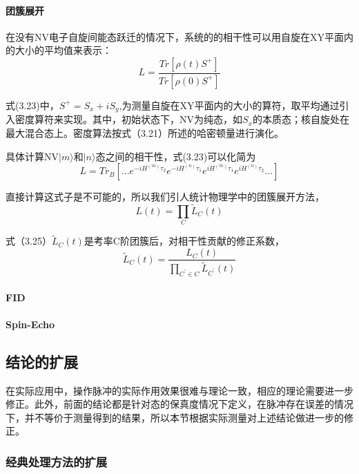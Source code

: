 \paragraph{团簇展开}
在没有NV电子自旋间能态跃迁的情况下，系统的的相干性可以用自旋在XY平面内的大小的平均值来表示：
\begin{equation}
    L=\frac{Tr[\rho(t) S^{+}]}{Tr[\rho(0) S^{+}]}
\end{equation}

式(3.23)中，$S^{+}=S_x+\num{i} S_y$,为测量自旋在XY平面内的大小的算符，取平均通过引入密度算符来实现。其中，初始状态下，NV为纯态，如$S_x$的本质态；核自旋处在最大混合态上。密度算法按式（3.21）所述的哈密顿量进行演化。

具体计算NV$|m\rangle$和$|n\rangle$态之间的相干性，式(3.23)可以化简为
\begin{equation}
    L=Tr_B[... e^{-\num{i} H^{(m)}\tau_2} e^{-\num{i} H^{(n)}\tau_1} e^{\num{i} H^{(m)}\tau_1} e^{\num{i} H^{(n)}\tau_2}...]
\end{equation}

直接计算这式子是不可能的，所以我们引人统计物理学中的团簇展开方法，
\begin{equation}
    L(t)=\prod_C \tilde{L}_C(t)
\end{equation}

式（3.25）$\tilde{L}_C(t)$是考率C阶团簇后，对相干性贡献的修正系数，
\begin{equation}
    \tilde{L}_C(t)=\frac{L_C(t)}{\prod_{C^{'} \in C} \tilde{L}_{C^{'}}(t) }
\end{equation}

\paragraph{FID}

\paragraph{Spin-Echo}

\subsection{结论的扩展}
在实际应用中，操作脉冲的实际作用效果很难与理论一致，相应的理论需要进一步修正。此外，前面的结论都是针对态的保真度情况下定义，在脉冲存在误差的情况下，并不等价于测量得到的结果，所以本节根据实际测量对上述结论做进一步的修正。
\subsubsection{经典处理方法的扩展}

